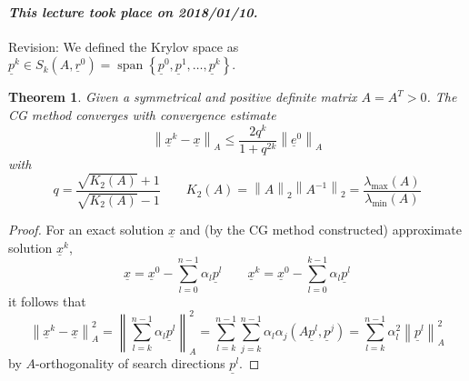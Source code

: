 \documentclass{article}
\newtheorem{theorem}{Theorem}
\newcommand{\norm}[1]{\left\|#1\right\|}
\newcommand{\dateref}[1]{\paragraph{\textit{This lecture took place on #1.}}}
\begin{document}
\dateref{2018/01/10}

Revision: We defined the Krylov space as $\underline{p}^k \in S_k(A, \underline r^0) = \operatorname{span}\left\{\underline p^0, \underline p^1, \ldots, \underline p^k\right\}$.

\begin{theorem}
  Given a symmetrical and positive definite matrix $A = A^T > 0$.
  The CG method converges with convergence estimate
  \[ \norm{\underline x^k - \underline x}_A \leq \frac{2q^k}{1 + q^{2k}} \norm{\underline e^0}_A \]
  with
  \[ q = \frac{\sqrt{K_2(A)} + 1}{\sqrt{K_2(A)} - 1} \qquad K_2(A) = \norm{A}_2 \norm{A^{-1}}_2 = \frac{\lambda_{\text{max}}(A)}{\lambda_{\text{min}}(A)} \]
\end{theorem}
\begin{proof}
  For an exact solution $\underline x$ and (by the CG method constructed) approximate solution $\underline x^k$,
  \[ \underline x = \underline x^0 - \sum_{l=0}^{n-1} \alpha_l \underline p^l \qquad \underline x^k = \underline x^0 - \sum_{l=0}^{k-1} \alpha_l \underline p^l \]
  it follows that
  \[ \norm{\underline x^k - \underline x}_A^2 = \norm{\sum_{l=k}^{n-1} \alpha_l \underline p^l}_A^2 = \sum_{l=k}^{n-1} \sum_{j=k}^{n-1} \alpha_l \alpha_j (A \underline p^l, \underline p^j) = \sum_{l=k}^{n-1} \alpha_l^2 \norm{\underline p^l}_A^2 \]
  by $A$-orthogonality of search directions $\underline p^l$.


\end{proof}
\end{document}
